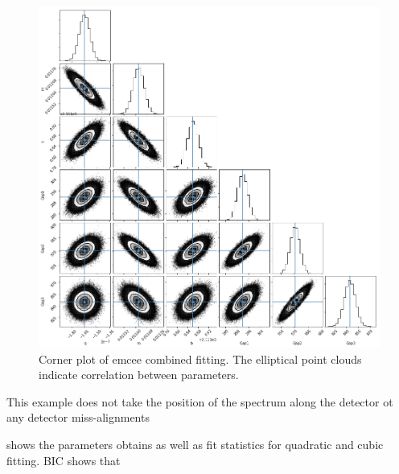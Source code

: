 \begin{figure}
    \centering
    \includegraphics[width=0.5\linewidth]{./figures/appendix/multidetecot_param_fit}
    \caption{Corner plot of emcee combined fitting. The elliptical point clouds indicate correlation between parameters.}
    \label{fig:multidetecotparamfit}
\end{figure}

This example does not take the  position of the spectrum along the detector ot any detector miss-alignments

 shows the parameters obtains as well as fit statistics for quadratic and cubic fitting. BIC shows that 

